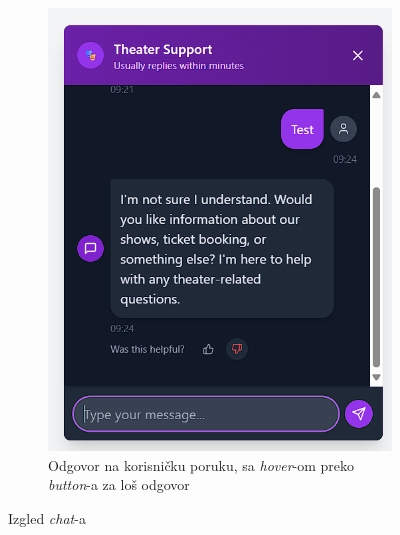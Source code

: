 \begin{itemize}
\begin{figure}[H]
\begin{subfigure}[b]{0.45\textwidth}
        \includegraphics[width=\linewidth]{Slike/FZ6/chatresponse.png}
        \caption{Odgovor na korisničku poruku, sa \textit{hover}-om preko \textit{button}-a za loš odgovor}
        \label{fig:chatresponse}
    \end{subfigure}
    \caption{Izgled \textit{chat}-a}
\end{figure}


\end{itemize}
